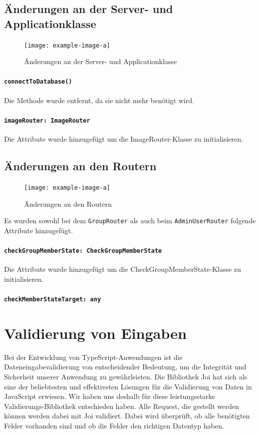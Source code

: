 \documentclass{implementierungsheft}
\begin{document}
\subsection{Änderungen an der Server- und Applicationklasse}

\begin{figure}[htp]
    \centering
    \texttt{[image: example-image-a]}
    \caption{Änderungen an der Server- und Applicationklasse}
    \label{fig:server}
\end{figure}
\paragraph{\texttt{connectToDatabase()}} Die Methode wurde entfernt, da sie nicht mehr benötigt wird.

\paragraph{\texttt{imageRouter: ImageRouter}} Die Attribute wurde hinzugefügt um die ImageRouter-Klasse zu initialisieren.

\subsection{Änderungen an den Routern}
\begin{figure}[htp]
    \centering
    \texttt{[image: example-image-a]}
    \caption{Änderungen an den Routern}
    \label{fig:routers}
\end{figure}

Es wurden sowohl bei dem \texttt{GroupRouter} als auch beim \texttt{AdminUserRouter} folgende Attribute hinzugefügt.

\paragraph{\texttt{checkGroupMemberState: CheckGroupMemberState}} Die Attribute wurde hinzugefügt um die CheckGroupMemberState-Klasse zu initialisieren.
\paragraph{\texttt{checkMemberStateTarget: any}} 

\section{Validierung von Eingaben}
Bei der Entwicklung von TypeScript-Anwendungen ist die Dateneingabevalidierung von entscheidender Bedeutung, um die Integrität und Sicherheit unserer Anwendung zu gewährleisten. Die Bibliothek Joi hat sich als eine der beliebtesten und effektivsten Lösungen für die Validierung von Daten in JavaScript erwiesen. Wir haben uns deshalb für diese leistungsstarke Validierungs-Bibliothek entschieden haben.
Alle Request, die gestellt werden können werden dabei mit Joi validiert. Dabei wird überprüft, ob alle benötigten Felder vorhanden sind und ob die Felder den richtigen Datentyp haben.
\end{document}
